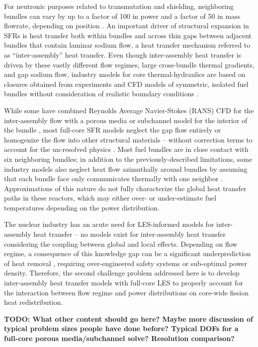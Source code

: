 For neutronic purposes related to transmutation and shielding, neighboring
bundles can vary by up to a factor of 100 in power and a factor of 50 in mass
flowrate, depending on position \cite{abr}. An important driver of structural
expansion in SFRs is heat transfer both within bundles and across thin gaps
between adjacent bundles that contain laminar sodium flow, a heat transfer
mechanism referred to as ``inter-assembly'' heat transfer. Even though
inter-assembly heat transfer is driven by these vastly different flow regimes,
large cross-bundle thermal gradients, and gap sodium flow, industry models for
core thermal-hydraulics are based on closures obtained from experiments and CFD
models of symmetric, isolated fuel bundles without consideration of realistic
boundary conditions \cite{touran}. 

While some have combined Reynolds Average Navier-Stokes (RANS) CFD for the
inter-assembly flow with a porous media or subchannel model for the interior of
the bundle \cite{wang2020,gerschenfeld}, most full-core SFR models neglect the
gap flow entirely \cite{touran} or homogenize the flow into other structural
materials \cite{fiorina_of} -- without correction terms to account for the
un-resolved physics \cite{touran,fiorina_of}. Most fuel bundles are in close
contact with six neighboring bundles; in addition to the previously-described
limitations, some industry models also neglect heat flow azimuthally around
bundles by assuming that each bundle face only communicates thermally with one
neighbor \cite{touran}. Approximations of this nature do not fully characterize
the global heat transfer paths in these reactors, which may either over- or
under-estimate fuel temperatures depending on the power distribution.

The nuclear industry has an acute need for LES-informed models for
inter-assembly heat transfer -- no models exist for inter-assembly heat
transfer considering the coupling between global and local effects. Depending
on flow regime, a consequence of this knowledge gap can be a significant
underprediction of heat removal \cite{gerschenfeld}, requiring over-engineered
safety systems or sub-optimal power density. Therefore, the second challenge
problem addressed here is to develop inter-assembly heat transfer models with
full-core LES to properly account for the interaction between flow regime and
power distributions on core-wide fission heat redistribution. 


{\bf TODO: What other content should go here? Maybe more discussion of typical
problem sizes people have done before? Typical DOFs for a full-core porous
media/subchannel solve? Resolution comparison?}

